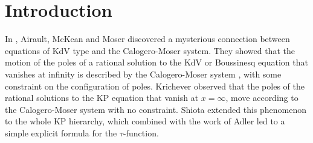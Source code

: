 \documentclass[11pt,reqno]{amsart}
\theoremstyle{definition}
\numberwithin{equation}{section}
\begin{document}
\maketitle
\section{Introduction}

In \cite{AMcKM}, Airault, McKean and Moser discovered a mysterious connection 
between equations of KdV type and the Calogero-Moser system.  
They showed that the motion of the poles of a rational solution to the KdV or 
Boussinesq equation that vanishes at infinity is described by the 
Calogero-Moser system \cite{C}, with some constraint on the configuration of 
poles. Krichever \cite{K} observed that the poles of the 
rational solutions to the KP equation that 
vanish at $x=\infty$, move according to the Calogero-Moser system with no 
constraint. Shiota \cite{Sh} extended this phenomenon to the whole 
KP hierarchy, which combined with the work of Adler \cite{A} led to a simple  
explicit formula for the $\tau$-function.
\end{document}
